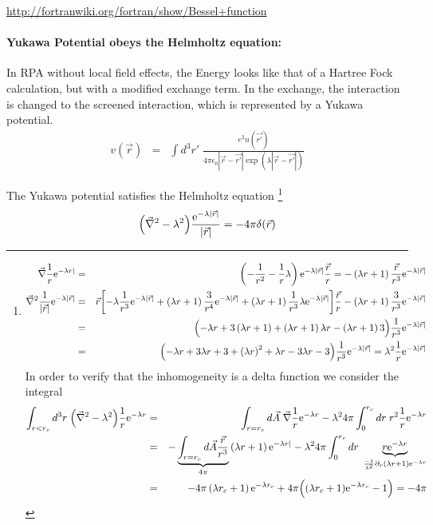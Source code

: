 \documentclass[11pt,a4paper]{report}
\begin{document}
\url{http://fortranwiki.org/fortran/show/Bessel+function}

\paragraph{Yukawa Potential obeys the Helmholtz equation:}
In RPA without local field effects, the Energy looks like that of a
Hartree Fock calculation, but with a modified exchange term. In the
exchange, the interaction is changed to the screened interaction,
which is represented by a Yukawa potential.
\begin{eqnarray}
v(\vec{r})&=&
\int d^3r'\; \frac{e^2 n(\vec{r'})}
{4\pi\epsilon_0|\vec{r}-\vec{r'}|\exp(\lambda|\vec{r}-\vec{r'}|)}
\label{eq:screenedcoulomb}
\end{eqnarray}

The Yukawa potential satisfies the Helmholtz equation
\footnote{
\begin{eqnarray}
\vec{\nabla}\frac{1}{r}\mathrm{e}^{-\lambda r|}
&=&\left(-\frac{1}{r^2}-\frac{1}{r}\lambda\right)\mathrm{e}^{-\lambda|\vec{r}|}
\frac{\vec{r}}{r}
=-\left(\lambda r+1\right)\frac{\vec{r}}{r^3}\mathrm{e}^{-\lambda|\vec{r}|}
\nonumber\\
\vec{\nabla}^2\frac{1}{|\vec{r}|}\mathrm{e}^{-\lambda|\vec{r}|}
&=&
\vec{r}\biggl[
-\lambda\frac{1}{r^3}\mathrm{e}^{-\lambda|\vec{r}|}
+\left(\lambda r+1\right)\frac{3}{r^4}\mathrm{e}^{-\lambda|\vec{r}|}
+\left(\lambda r+1\right)\frac{1}{r^3}\lambda\mathrm{e}^{-\lambda|\vec{r}|}
\biggr]\frac{\vec{r}}{r}
-\left(\lambda r+1\right)\frac{3}{r^3}\mathrm{e}^{-\lambda|\vec{r}|}
\nonumber\\
&=&
\Bigl(
-\lambda r
+3\left(\lambda r+1\right)
+\left(\lambda r+1\right)\lambda r
-\left(\lambda r+1\right)3
\Bigr)
\frac{1}{r^3}\mathrm{e}^{-\lambda|\vec{r}|}
\nonumber\\
&=&
\Bigl(
-\lambda r
+3\lambda r+3
+\left(\lambda r\right)^2+\lambda r
-3\lambda r-3
\Bigr)
\frac{1}{r^3}\mathrm{e}^{-\lambda|\vec{r}|}
=\lambda^2\frac{1}{r}\mathrm{e}^{-\lambda|\vec{r}|}
\nonumber\\
\end{eqnarray}
In order to verify that the inhomogeneity is a delta function we
consider the integral
\begin{eqnarray}
\int_{r<r_c} d^3r\;\Bigl(\vec{\nabla}^2-\lambda^2\Bigr)
\frac{1}{r}\mathrm{e}^{-\lambda r}&=&
\int_{r=r_c} d\vec{A}\;\vec{\nabla}\frac{1}{r}\mathrm{e}^{-\lambda r}
-\lambda^2 4\pi\int_0^{r_c}dr\; r^2\frac{1}{r}\mathrm{e}^{-\lambda r}
\nonumber\\
&=&
-\underbrace{\int_{r=r_c} d\vec{A}\frac{\vec{r}}{r^3}}_{4\pi}
\left(\lambda r+1\right)\mathrm{e}^{-\lambda r|}
-\lambda^2 4\pi\int_0^{r_c}dr\; 
\underbrace{r\mathrm{e}^{-\lambda r}
}_{\frac{-1}{\lambda^2}\partial_r (\lambda r+1)\mathrm{e}^{-\lambda r}}
\nonumber\\
&=&
-4\pi 
\left(\lambda r_c+1\right)\mathrm{e}^{-\lambda r_c}
+4\pi \Bigl((\lambda r_c+1)\mathrm{e}^{-\lambda r_c}-1\Bigr)=-4\pi
\end{eqnarray}
}
\begin{eqnarray}
\Bigl(\vec{\nabla}^2-\lambda^2\Bigr)
\frac{\mathrm{e}^{-\lambda|\vec{r}|}}{|\vec{r}|}=-4\pi\delta(\vec{r})
\end{eqnarray}
\end{document}
